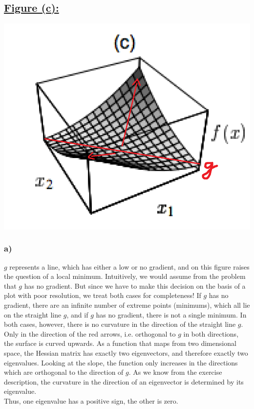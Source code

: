 \documentclass[a4paper]{article}
\begin{document}
    \subsection*{\underline{Figure (c):}}
        \includegraphics[width=0.8\linewidth]{Assignment 5/3.png}
        \subsubsection*{a)}
            $g$ represents a line, which has either a low or no gradient, and on this figure raises the question of a local minimum.
            Intuitively, we would assume from the problem that $g$ has no gradient. 
            But since we have to make this decision on the basis of a plot with poor resolution, we treat both cases for completeness!
            If $g$ has no gradient, there are an infinite number of extreme points (minimums), which all lie on the straight line $g$, and if $g$ has no gradient, there is not a single minimum.
            In both cases, however, there is no curvature in the direction of the straight line $g$.
            Only in the direction of the red arrows, i.e. orthogonal to $g$ in both directions, the surface is curved upwards.
            As a function that maps from two dimensional space, the Hessian matrix has exactly two eigenvectors, and therefore exactly two eigenvalues.
            Looking at the slope, the function only increases in the directions which are orthogonal to the direction of $g$.
            As we know from the exercise description, the curvature in the direction of an eigenvector is determined by its eigenvalue.\\
            Thus, one eigenvalue has a positive sign, the other is zero.
\end{document}

